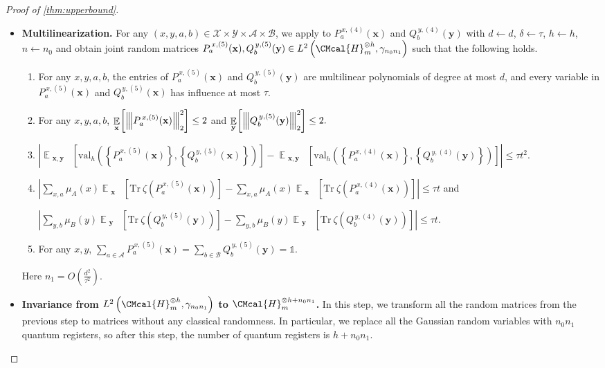 \documentclass[11pt]{article}
\def\H{\CMcal{H}}
\theoremstyle{plain}
\theoremstyle{definition}
\newcommand {\minusspace} {\: \! \!}
\newcommand {\Fn} [2] {\ensuremath{ #1 \minusspace \Br{ #2 } }}
\newcommand {\set} [1] {\ensuremath{ \left\lbrace #1 \right\rbrace }}
\newcommand {\br} [1] {\ensuremath{ \left( #1 \right) }}
\newcommand {\Br} [1] {\ensuremath{ \left[ #1 \right] }}
\newcommand {\ab} [1] {\ensuremath{ \left| #1 \right| }}
\DeclareMathOperator*{\bigE}{\mathbb{E}}
\newcommand {\expec} [2] {\Fn{\bigE_{\substack{#1}}}{#2}}
\newcommand{\nnorm}[1]{{\left\vert\kern-0.25ex\left\vert\kern-0.25ex\left\vert #1
		\right\vert\kern-0.25ex\right\vert\kern-0.25ex\right\vert}}
\newcommand {\Tr} {\ensuremath{ \mathrm{Tr} }}
\newcommand {\id} {\ensuremath{\mathds{1}}}
\newcommand{\randx}{\ensuremath{\mathbf{x}}}
\newcommand{\randy}{\ensuremath{\mathbf{y}}}
\newcommand{\herspace}[1]{\ensuremath{\H_m^{\otimes #1}}}
\newcommand{\gval}[3]{\ensuremath{\mathrm{val}_{#1}\br{\set{#2},\set{#3}}}}
\newcommand{\fourtuples}{\ensuremath{\br{x,y,a,b}\in\calX\times\calY\times\calA\times\calB}}
\newcommand{\Pnn}[1] {\ensuremath{{P^{\,x, (#1)}_a}}}
\newcommand{\Qnn}[1] {\ensuremath{{Q^{\,y, (#1)}_b}}}
\newcommand{\calX}{\mathcal{X}}
\newcommand{\calY}{\mathcal{Y}}
\newcommand{\calA}{\mathcal{A}}
\newcommand{\calB}{\mathcal{B}}
\newcommand{\1}{\mathbb{1}} %
\begin{document}
\begin{proof}[Proof of \cref{thm:upperbound}]
\begin{itemize}
\begin{enumerate}
\item For any $x,y$, $\sum_{a\in\calA}\Pnn{4}(\randx)=\sum_{b\in\calB}\Qnn{4}(\randy)=\id.$
\end{enumerate}


\item \textbf{Multilinearization.}
For any \fourtuples, we apply \cite[Lemma 13.1]{qin2021nonlocal} to $\Pnn{4}(\randx)$ and $\Qnn{4}(\randy)$ with $d\gets d$, $\delta\gets\tau$, $h\gets h$, $n\gets n_0$ and obtain joint random matrices $\Pnn{5}(\randx),\Qnn{5}(\randy)\in L^2\br{\herspace{h},\gamma_{n_0n_1}}$ such that the following holds.
\begin{enumerate}
\item For any $x,y,a,b$, the entries of $\Pnn{5}(\randx)$ and $\Qnn{5}(\randy)$ are multilinear polynomials of degree at most $d$, and every variable in $\Pnn{5}(\randx)$ and $\Qnn{5}(\randx)$ has influence at most $\tau$.
						
\item For any $x,y,a,b$, $\displaystyle\expec{\randx}{\nnorm{\Pnn{5}(\randx)}_2^2}\leq2$ and
$\displaystyle\expec{\randy}{\nnorm{\Qnn{5}(\randy)}_2^2}\leq2.$

\item $\displaystyle\ab{\expec{\randx,\randy}{\gval{h}{\Pnn{5}(\randx)}{\Qnn{5}(\randx)}}-\expec{\randx,\randy}{\gval{h}{\Pnn{4}(\randx)}{\Qnn{4}(\randy)}}}\leq\tau t^2.$

\item $\displaystyle\ab{\sum_{x,a}\mu_A(x)\expec{\randx}{\Tr~\zeta\br{\Pnn{5}(\randx)}}-\sum_{x,a}\mu_A(x)\expec{ \randx}{\Tr~\zeta\br{\Pnn{4}(\randx)}}}\leq\tau t$ \quad and

$\displaystyle\ab{\sum_{y,b}\mu_B(y)\expec{\randy}{\Tr~\zeta\br{\Qnn{5}(\randy)}}-\sum_{y,b}\mu_B(y)\expec{ \randy}{\Tr~\zeta\br{\Qnn{4}(\randy)}}}\leq\tau t.$

\item For any $x,y$, $\sum_{a\in\calA}\Pnn{5}(\randx)=\sum_{b\in\calB}\Qnn{5}(\randy)=\id.$
\end{enumerate}
Here $n_1=O\br{\frac{d^2}{\tau^2}}.$

\item \textbf{Invariance from $L^2\br{\herspace{h},\gamma_{n_0n_1}}$ to $\herspace{h+n_0n_1}$.}
In this step, we transform all the random matrices from the previous step to matrices without any classical randomness.
In particular, we replace all the Gaussian random variables with $n_0n_1$ quantum registers, so after this step, the number of quantum registers is $h + n_0n_1$.


\end{itemize}
\end{proof}
\end{document}
